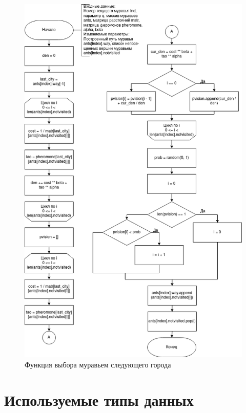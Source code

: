 \begin{figure}[H]
	\begin{center}
		\includegraphics[scale=0.6]{assets/next_city.png}
	\end{center}
	\caption{Функция выбора муравьем следующего города}
\end{figure}

\newpage
\section{Используемые типы данных}

